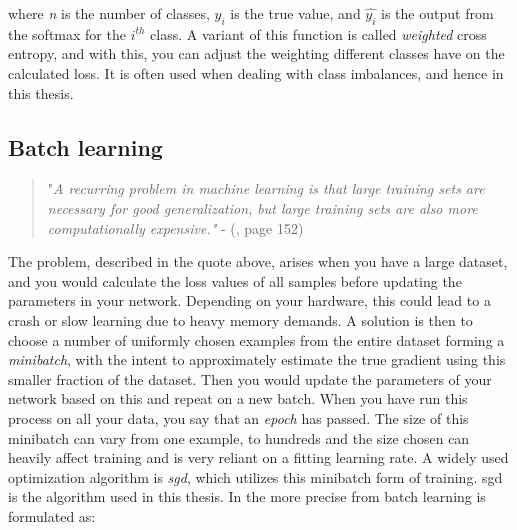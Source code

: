     where \textit{n} is the number of classes, $y_{i}$ is the true value, and $\hat{y_{i}}$ is the output from the softmax for the $i^{th}$ class. A variant of this function is called \textit{weighted} cross entropy\cite{ho2019real_weighted_cross_entropy}, and with this, you can adjust the weighting different classes have on the calculated loss. It is often used when dealing with class imbalances, and hence in this thesis.

    
    

\subsection{Batch learning} \label{batch learning}
        \begin{quote}
        "\textit{A recurring problem in machine learning is that large training sets are necessary for good generalization, but large training sets are also more computationally
        expensive."} - (\citeauthor{Goodfellow-et-al-2016_SGD}\citeyear{Goodfellow-et-al-2016_SGD}, page 152)
    \end{quote}
    
    The problem, described in the quote above, arises when you have a large dataset, and you would calculate the loss values of all samples before updating the parameters in your network\cite{Goodfellow-et-al-2016_SGD}. Depending on your hardware, this could lead to a crash or slow learning due to heavy memory demands. A solution is then to choose a number of uniformly chosen examples from the entire dataset forming a \textit{minibatch}, with the intent to approximately estimate the true gradient using this smaller fraction of the dataset. Then you would update the parameters of your network based on this and repeat on a new batch. When you have run this process on all your data, you say that an \textit{epoch} has passed. The size of this minibatch can vary from one example, to hundreds and the size chosen can heavily affect training and is very reliant on a fitting learning rate\cite{wilson2001need_learning_rate}. A widely used optimization algorithm is \textit{\gls{sgd}}\cite{Goodfellow-et-al-2016_SGD}, which utilizes this minibatch form of training. \gls{sgd} is the algorithm used in this thesis. In the more precise from batch learning is formulated as:
    
